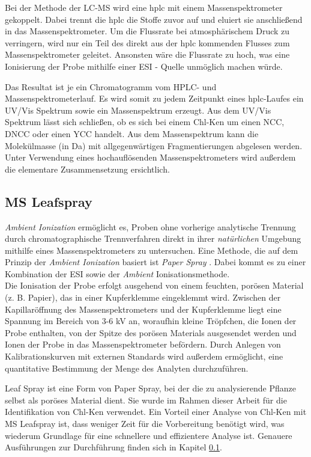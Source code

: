 Bei der Methode der LC-MS wird eine \gls{hplc} mit einem Massenspektrometer gekoppelt. Dabei trennt die \gls{hplc} die Stoffe zuvor auf und eluiert sie anschließend in das Massenspektrometer. \cite[S. 217-218]{MassSpectrometry} Um die Flussrate bei atmosphärischem Druck zu verringern, wird nur ein Teil des direkt aus der \gls{hplc} kommenden Flusses zum Massenspektrometer geleitet. Ansonsten wäre die Flussrate zu hoch, was eine Ionisierung der Probe mithilfe einer \gls{ESI} - Quelle unmöglich machen würde. \cite[S. 221]{MassSpectrometry} 

Das Resultat ist je ein Chromatogramm vom HPLC- und Massenspektrometerlauf. Es wird somit zu jedem Zeitpunkt eines \gls{hplc}-Laufes ein UV/Vis Spektrum sowie ein Massenspektrum erzeugt. Aus dem UV/Vis Spektrum lässt sich schließen, ob es sich bei einem \gls{Chl-K}en um einen \gls{NCC}, \gls{DNCC} oder einen \gls{YCC} handelt. Aus dem Massenspektrum kann die Molekülmasse (in Da) mit allgegenwärtigen Fragmentierungen abgelesen werden. Unter Verwendung eines hochauflösenden Massenspektrometers wird außerdem die elementare Zusammensetzung ersichtlich. \\

\subsection{MS Leafspray} \label{sec:MSLeafspray}

\textit{Ambient Ionization} \cite{AmbientIonisation} ermöglicht es, Proben ohne vorherige analytische Trennung durch chromatographische Trennverfahren direkt in ihrer \textit{natürlichen} Umgebung mithilfe eines Massenspektrometers zu untersuchen. Eine Methode, die auf dem Prinzip der \textit{Ambient Ionization} basiert ist \textit{Paper Spray} \cite{PaperSpray}. Dabei  kommt es zu einer Kombination der \gls{ESI} sowie der \textit{Ambient} Ionisationsmethode. \cite{PaperSpray}\\

Die Ionisation der Probe erfolgt ausgehend von einem feuchten, porösen Material (z. B. Papier), das in einer Kupferklemme eingeklemmt wird. Zwischen der Kapillaröffnung des Massenspektrometers und der Kupferklemme liegt eine Spannung im Bereich von 3-6 kV an, woraufhin kleine Tröpfchen, die Ionen der Probe enthalten, von der Spitze des porösen Materials ausgesendet werden und Ionen der Probe in das Massenspektrometer befördern. \cite{RapidScreeningLeafSpray} Durch Anlegen von Kalibrationskurven mit externen Standards wird außerdem ermöglicht, eine quantitative Bestimmung der Menge des Analyten durchzuführen. \cite{LeafSpray}

Leaf Spray ist eine Form von Paper Spray, bei der die zu analysierende Pflanze selbst als poröses Material dient. Sie wurde im Rahmen dieser Arbeit für die Identifikation von \gls{Chl-K}en verwendet. Ein Vorteil einer Analyse von \gls{Chl-K}en mit MS Leafspray ist, dass weniger Zeit für die Vorbereitung benötigt wird, was wiederum Grundlage für eine schnellere und effizientere Analyse ist. Genauere Ausführungen zur Durchführung finden sich in Kapitel \ref{sec:MSLeafspray}.\\